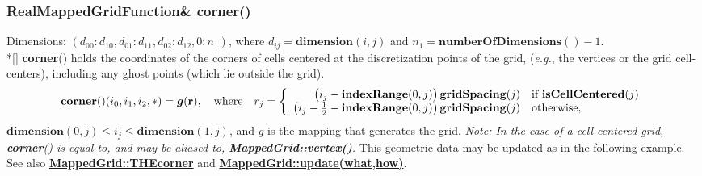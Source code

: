 \documentclass{article}
\begin{document}
  \subsubsection{RealMappedGridFunction\& corner()}
  \label{MappedGrid::corner()}
    Dimensions: $(d_{00}\colon d_{10},d_{01}\colon d_{11},d_{02}\colon d_{12},0\colon n_1)$,
    where $d_{ij} = \textbf{dimension}(i,j)$ and $n_1 = \textbf{numberOfDimensions}() - 1$. \\*[\parskip]
    \textbf{corner}() holds the coordinates of the corners of cells centered at the discretization points of the grid,
    ({\sl{}e.g.}, the vertices or the grid cell-centers), including any ghost points (which lie outside the grid).
    \[
      \textbf{corner}()(i_0,i_1,i_2,\ast) = \mbox{\boldmath $g$}(\textbf{r}),
      \quad\mbox{where}\quad
      r_j = \left\{ \begin{array}{rl}
        \big(i_j             - \textbf{indexRange}(0,j)\big)\,\textbf{gridSpacing}(j) & \mbox{if \bf{}isCellCentered}(j) \\
        \big(i_j - {1\over2} - \textbf{indexRange}(0,j)\big)\,\textbf{gridSpacing}(j) & \mbox{otherwise},                \\
      \end{array} \right.
    \]
    $\textbf{dimension}(0,j) \le i_j \le \textbf{dimension}(1,j)$, and {\boldmath $g$} is the mapping that generates the grid.
    {\em Note:  In the case of a cell-centered grid, \textbf{corner}() is equal to, and may be aliased to,
    {\bf{}\hyperref{vertex()}{vertex() \rm(\S}{)}{MappedGrid::vertex()}}.}
    This geometric data may be updated as in the following example.
    See also {\bf{}\hyperref{THEcorner}{THEcorner \rm(\S}{)}{MappedGrid::THEcorner}} and
    {\bf{}\hyperref{update(what,how)}{update(what,how) \rm(\S}{)}{MappedGrid::update(what,how)}}.
\end{document}
